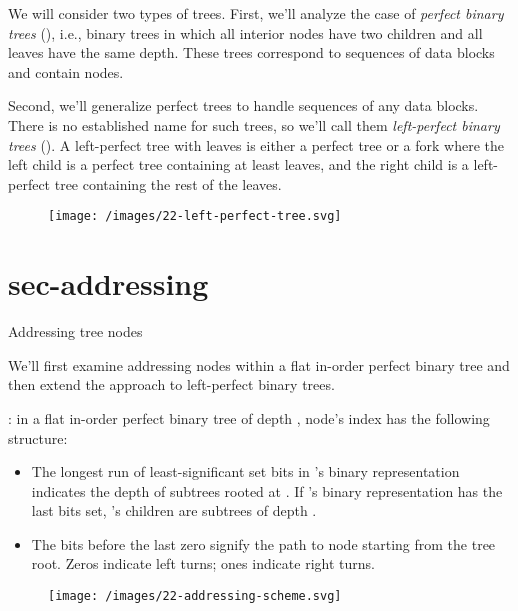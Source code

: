 \documentclass{article}
\begin{document}
We will consider two types of trees.
First, we'll analyze the case of \emph{perfect binary trees} (), i.e., binary trees in which all interior nodes have two children and all leaves have the same depth.
These trees correspond to sequences of  data blocks and contain  nodes.

Second, we'll generalize perfect trees to handle sequences of any  data blocks.
There is no established name for such trees, so we'll call them \emph{left-perfect binary trees} ().
A left-perfect tree with  leaves is either a perfect tree or a fork where the left child is a perfect tree containing at least  leaves, and the right child is a left-perfect tree containing the rest of the leaves.

\begin{figure}[grayscale-diagram,medium-size]
  \texttt{[image: /images/22-left-perfect-tree.svg]}
\end{figure}

\section{sec-addressing}{Addressing tree nodes}

We'll first examine addressing nodes within a flat in-order perfect binary tree and then extend the approach to left-perfect binary trees.

: in a flat in-order perfect binary tree of depth , node's index  has the following structure:
\begin{itemize}
    \item
    The longest run of least-significant set bits in 's binary representation indicates the depth of subtrees rooted at .
    If 's binary representation has the last  bits set, 's children are subtrees of depth .
    \item
    The bits before the last zero signify the path to node  starting from the tree root.
    Zeros indicate left turns; ones indicate right turns.
\end{itemize}

\begin{figure}[grayscale-diagram,medium-size]
  \texttt{[image: /images/22-addressing-scheme.svg]}
\end{figure}
\end{document}
